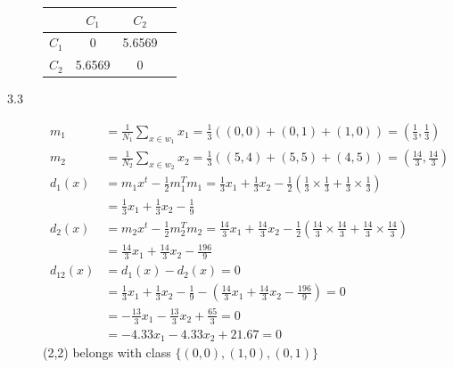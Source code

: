 \documentclass[fleqn]{article}
\begin{document}
\begin{description}
    \begin{tabular}{ l c c c }
        & \begin{math}C_1\end{math} & \begin{math}C_2\end{math} \\
        \hline
        \begin{math}C_1\end{math} & 0      & 5.6569 \\
        \begin{math}C_2\end{math} & 5.6569 & 0      \\
    \end{tabular}

\item [3.3]
    \begin{align*}
        m_1 &= \frac{1}{N_1} \sum_{x \in w_1}{x_1} = \frac{1}{3} \left ( (0,0) + (0,1) + (1,0) \right ) = (\frac{1}{3}, \frac{1}{3}) \\
        m_2 &= \frac{1}{N_2}\sum_{x \in w_2}{x_2} = \frac{1}{3} \left ( (5,4) + (5,5) + (4,5) \right ) = (\frac{14}{3}, \frac{14}{3}) \\
        d_1(x) &= m_1x^t - \frac{1}{2}m_1^Tm_1 = \frac{1}{3}x_1 + \frac{1}{3}x_2 - \frac{1}{2} \left ( \frac{1}{3} \times \frac{1}{3} + \frac{1}{3} \times \frac{1}{3} \right ) \\
               &= \frac{1}{3}x_1 + \frac{1}{3}x_2 - \frac{1}{9} \\
        d_2(x) &= m_2x^t - \frac{1}{2}m_2^Tm_2 = \frac{14}{3}x_1 + \frac{14}{3}x_2 - \frac{1}{2} \left ( \frac{14}{3} \times \frac{14}{3} + \frac{14}{3} \times \frac{14}{3} \right ) \\
               &= \frac{14}{3}x_1 + \frac{14}{3}x_2 - \frac{196}{9} \\
        d_{12}(x) &= d_1(x) - d_2(x) = 0 \\
                  &= \frac{1}{3}x_1 + \frac{1}{3}x_2 - \frac{1}{9} - \left (\frac{14}{3}x_1 + \frac{14}{3}x_2 - \frac{196}{9} \right ) = 0 \\
                  &= -\frac{13}{3}x_1 - \frac{13}{3}x_2 + \frac{65}{3} = 0 \\
                  &= -4.33x_1 - 4.33x_2 + 21.67 = 0
    \end{align*}
    (2,2) belongs with class \begin{math}\{(0,0), (1,0), (0,1)\}\end{math}


\end{description}
\end{document}
